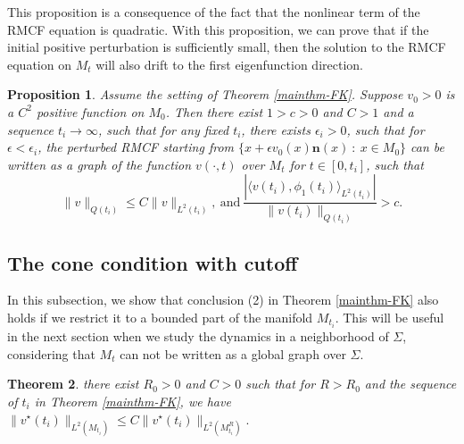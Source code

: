 \documentclass[12pt]{amsart}
\numberwithin{equation}{section}
\newtheorem{theorem}{Theorem}[section]
\newtheorem{proposition}[theorem]{Proposition}
\numberwithin{equation}{section}
\newcommand{\bn}{\mathbf{n}}
\begin{document}
	This proposition is a consequence of the fact that the nonlinear term of the RMCF equation is quadratic. With this proposition, we can prove that if the initial positive perturbation is sufficiently small, then the solution to the RMCF equation on $M_t$ will also drift to the first eigenfunction direction. 
	
	\begin{proposition}\label{thm:perturbedRMCFto1st}
		Assume the setting of Theorem \ref{mainthm-FK}.	Suppose $v_0>0$ is a $C^{2}$ positive function on $M_0$. Then there exist $1>c>0$ and $C>1$ and a sequence $t_i\to\infty$, such that for any fixed $t_i$, there exists $\epsilon_i>0$, such that for $\epsilon<\epsilon_i$, the perturbed RMCF starting from $\{x+\epsilon v_0(x)\bn(x)\ :\ x\in M_0\}$ can be written as a graph of the function $v(\cdot,t)$ over $M_t$ for $t\in[0,t_i]$, such that 
		$$\|v\|_{Q({t_i})}\leq C\|v\|_{L^2({t_i})},\ \mathrm{and}\ \frac{|\langle v(t_i),\phi_1(t_i)\rangle_{L^2({t_i})}|}{\|v(t_i)\|_{Q({t_i})}}>c.$$ 
	\end{proposition}
	
	\subsection{The cone condition with cutoff}
	In this subsection, we show that conclusion (2) in Theorem \ref{mainthm-FK} also holds if we restrict it to a bounded part of the manifold $M_{t_i}$. This will be useful in the next section when we study the dynamics in a neighborhood of $\Sigma$, considering that $M_t$ can not be written as a global graph over $\Sigma$. 
	
	
	\begin{theorem}\label{thm:vstarcutsmall}
		there exist $R_0>0$ and $C>0$ such that for $R>R_0$ and the sequence of $t_i$ in Theorem \ref{mainthm-FK}, we have 
		$\|v^\star(t_i)\|_{L^2(M_{t_i})}\leq C\|v^\star(t_i)\|_{L^2(M_{t_i}^R)}.$
	\end{theorem}
	
\end{document}
